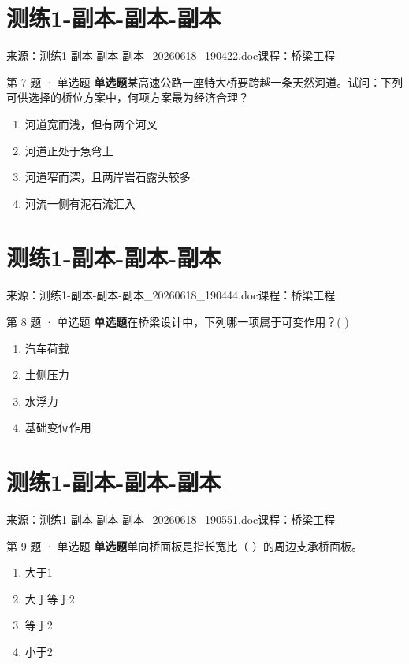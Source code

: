 \documentclass[UTF8,zihao=-4,openany]{ctexbook}
\newenvironment{choices}{\begin{enumerate}[label=\Alph*.,leftmargin=9mm,labelsep=3mm,itemsep=2pt,topsep=4pt]}{\end{enumerate}}
\newcommand{\qtype}[1]{\textcolor{brand}{\sffamily\bfseries #1}}
\newcommand{\sourcefile}[1]{\textcolor{muted}{\small\sffamily 来源：#1}}
\begin{document}
\chapter{测练1-副本-副本-副本}

\sourcefile{测练1-副本-副本-副本\_20260618\_190422.doc}\quad \textcolor{muted}{\small\sffamily 课程：桥梁工程}

\begin{questionbox}{第 7 题 · 单选题}
\qtype{单选题}\quad 某高速公路一座特大桥要跨越一条天然河道。试问：下列可供选择的桥位方案中，何项方案最为经济合理？
\begin{choices}
\item 河道宽而浅，但有两个河叉
\item 河道正处于急弯上
\item 河道窄而深，且两岸岩石露头较多
\item 河流一侧有泥石流汇入
\end{choices}
\end{questionbox}

\chapter{测练1-副本-副本-副本}

\sourcefile{测练1-副本-副本-副本\_20260618\_190444.doc}\quad \textcolor{muted}{\small\sffamily 课程：桥梁工程}

\begin{questionbox}{第 8 题 · 单选题}
\qtype{单选题}\quad 在桥梁设计中，下列哪一项属于可变作用？( )
\begin{choices}
\item 汽车荷载
\item 土侧压力
\item 水浮力
\item 基础变位作用
\end{choices}
\end{questionbox}

\chapter{测练1-副本-副本-副本}

\sourcefile{测练1-副本-副本-副本\_20260618\_190551.doc}\quad \textcolor{muted}{\small\sffamily 课程：桥梁工程}

\begin{questionbox}{第 9 题 · 单选题}
\qtype{单选题}\quad 单向桥面板是指长宽比（ ）的周边支承桥面板。
\begin{choices}
\item 大于1
\item 大于等于2
\item 等于2
\item 小于2
\end{choices}
\end{questionbox}
\end{document}
